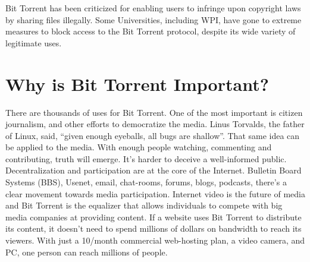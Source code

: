 \documentclass[a4paper,12pt]{report}
\begin{document}
Bit Torrent has been criticized for enabling users to infringe upon copyright laws by sharing files illegally. Some Universities, including WPI, have gone to extreme measures to block access to the Bit Torrent protocol, despite its wide variety of legitimate uses. 


\section{Why is Bit Torrent Important?}
There are thousands of uses for Bit Torrent. 
One of the most important is citizen journalism, and other efforts to democratize the media. 
Linus Torvalds, the father of Linux, said, “given enough eyeballs, all bugs are shallow”. 
That same idea can be applied to the media. 
With enough people watching, commenting and contributing, truth will emerge. It’s harder to deceive a well-informed public. 
Decentralization and participation are at the core of the Internet. 
Bulletin Board Systems (BBS), Usenet, email, chat-rooms, forums, blogs, podcasts, there’s a clear movement towards media participation. 
Internet video is the future of media and Bit Torrent is the equalizer that allows individuals to compete with big media companies at providing content. If a website uses Bit Torrent to distribute its content, it doesn’t need to spend millions of dollars on bandwidth to reach its viewers. With just a 10/month commercial web-hosting plan, a video camera, and PC, one person can reach millions of people.
\end{document}
